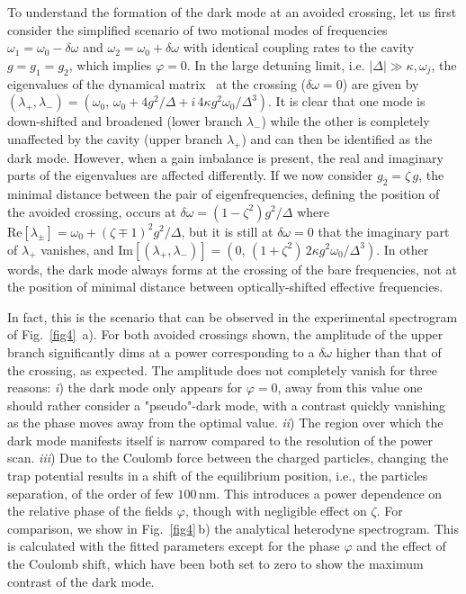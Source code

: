 \documentclass[aps,preprint,singlecolumn,nopacs,superscriptaddress,groupedaddress]{revtex4}
\newcommand{\di}{i}
\begin{document}
To understand the formation of the dark mode at an avoided crossing, let us first consider the simplified scenario of two motional modes of frequencies $\omega_1=\omega_0-\delta \omega$ and $\omega_2=\omega_0+\delta \omega$ with identical coupling rates to the cavity $g=g_1=g_2$, which implies $\varphi=0$. In the large detuning limit, i.e. $|\Delta|\gg \kappa, \omega_j$, the eigenvalues of the dynamical matrix~\cite{supp} at the crossing ($\delta\omega=0$) are given by $(\lambda_+,\lambda_-)=(\omega_0,\,\omega_0+4g^2/\Delta+\di\,4\kappa g^2 \omega_0/\Delta^3)$. It is clear that one mode is down-shifted and broadened (lower branch $\lambda_-$) while the other is completely unaffected by the cavity (upper branch $\lambda_+$) and can then be identified as the dark mode. However, when a gain imbalance is present, the real and imaginary parts of the eigenvalues are affected differently. If we now consider $g_2=\zeta\,g$, the minimal distance between the pair of eigenfrequencies, defining the position of the avoided crossing, occurs at $\delta\omega=(1-\zeta^2)g^2/\Delta$ where $\mathrm{Re}[\lambda_{\pm}]=\omega_0+(\zeta\mp1)^2 g^2/\Delta$, but it is still at $\delta\omega=0$ that the imaginary part of $\lambda_+$ vanishes, and $\mathrm{Im}[(\lambda_+,\lambda_-)]=(0,\,(1+\zeta^2)\,2\kappa g^2 \omega_0/\Delta^3)$. In other words, the dark mode always forms at the crossing of the bare frequencies, not at the position of minimal distance between optically-shifted effective frequencies.

In fact, this is the scenario that can be observed in the experimental spectrogram of Fig.~\ref{fig4}~a). For both avoided crossings shown, the amplitude of the upper branch significantly dims at a power corresponding to a $\delta\omega$ higher than that of the crossing, as expected. The amplitude does not completely vanish for three reasons: \emph{i}) the dark mode only appears for $\varphi=0$, away from this value one should rather consider a "pseudo"-dark mode, with a contrast quickly vanishing as the phase moves away from the optimal value. \emph{ii}) The region over which the dark mode manifests itself is narrow compared to the resolution of the power scan. \emph{iii}) Due to the Coulomb force between the charged particles, changing the trap potential results in a shift of the equilibrium position, i.e., the particles separation, of the order of few $100$\,nm. This introduces a power dependence on the relative phase of the fields $\varphi$, though with negligible effect on $\zeta$. For comparison, we show in Fig.~\ref{fig4}\,b) the analytical heterodyne spectrogram. This is calculated with the fitted parameters except for the phase $\varphi$ and the effect of the Coulomb shift, which have been both set to zero to show the maximum contrast of the dark mode. 
\end{document}
